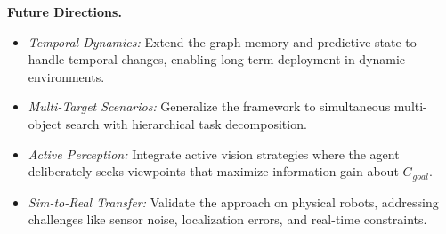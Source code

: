 \documentclass{article}
\begin{document}
\textbf{Future Directions.}
\begin{itemize}
    \item \textit{Temporal Dynamics:} Extend the graph memory and predictive state to handle temporal changes, enabling long-term deployment in dynamic environments.
    \item \textit{Multi-Target Scenarios:} Generalize the framework to simultaneous multi-object search with hierarchical task decomposition.
    \item \textit{Active Perception:} Integrate active vision strategies where the agent deliberately seeks viewpoints that maximize information gain about $G_{goal}$.
    \item \textit{Sim-to-Real Transfer:} Validate the approach on physical robots, addressing challenges like sensor noise, localization errors, and real-time constraints.
\end{itemize}

\newpage

\end{document}
